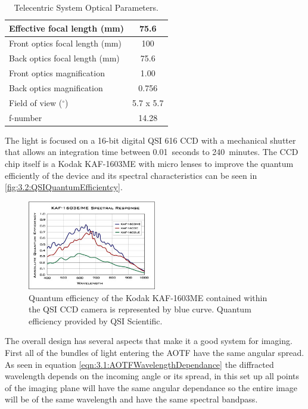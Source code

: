 \begin{table}[h!]
    \begin{center}
    \begin{tabular}{|l|c|}
    \hline
    Effective focal length (mm) & 75.6 \\
    \hline
    Front optics focal length (mm) & 100 \\
    \hline
    Back optics focal length (mm) & 75.6 \\
    \hline
    Front optics magnification & 1.00 \\
    \hline
    Back optics magnification & 0.756 \\
    \hline
    Field of view ($^{\circ}$) & 5.7 x 5.7 \\
    \hline
    f-number & 14.28 \\
    \hline
    \end{tabular}
    \end{center}
    \caption{Telecentric System Optical Parameters.}
    \label{tab:3.2:telecenticSystemParameters}
\end{table}

The light is focused on a 16-bit digital QSI 616 CCD with a mechanical shutter that allows an integration time between 0.01~seconds to 240~minutes. The CCD chip itself is a Kodak KAF-1603ME with micro lenses to improve the quantum efficiently of the device and its spectral characteristics can be seen in \autoref{fig:3.2:QSIQuantumEfficientcy}.

\begin{figure}[h!]
    \begin{center}
    \includegraphics[width=0.5\textwidth]{./Images/3-2-QsiCcdQe.jpg}
    \caption[QSI 616 Camera Quantum Efficiency]{Quantum efficiency of the Kodak KAF-1603ME contained within the QSI CCD camera is represented by blue curve. Quantum efficiency provided by QSI Scientific. }
    \label{fig:3.2:QSIQuantumEfficientcy}
    \end{center}
\end{figure}

The overall design has several aspects that make it a good system for imaging. First all of the bundles of light entering the AOTF have the same angular spread. As seen in equation \autoref{eqn:3.1:AOTFWavelengthDependance} the diffracted wavelength depends on the incoming angle or its spread, in this set up all points of the imaging plane will have the same angular dependance so the entire image will be of the same wavelength and have the same spectral bandpass.

